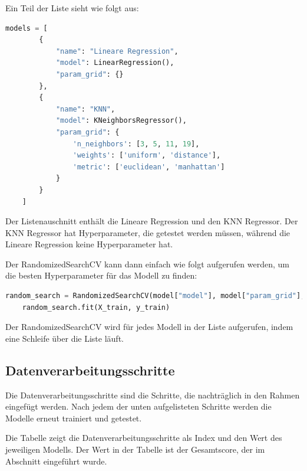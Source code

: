 Ein Teil der Liste sieht wie folgt aus:

\begin{lstlisting}[language=Python, caption=Liste der Modelle]
    models = [
        {
            "name": "Lineare Regression",
            "model": LinearRegression(),
            "param_grid": {}
        },
        {
            "name": "KNN",
            "model": KNeighborsRegressor(),
            "param_grid": {
                'n_neighbors': [3, 5, 11, 19],
                'weights': ['uniform', 'distance'],
                'metric': ['euclidean', 'manhattan']
            }
        }
    ]
\end{lstlisting}

Der Listenauschnitt enthält die Lineare Regression und den KNN Regressor. Der KNN Regressor hat Hyperparameter, die getestet werden müssen, während die Lineare Regression keine Hyperparameter hat.

Der RandomizedSearchCV kann dann einfach wie folgt aufgerufen werden, um die besten Hyperparameter für das Modell zu finden:

\begin{lstlisting}[language=Python, caption=RandomizedSearchCV]
    random_search = RandomizedSearchCV(model["model"], model["param_grid"], n_iter=5, cv=5, n_jobs=-1, verbose=2)
    random_search.fit(X_train, y_train)
\end{lstlisting}

Der RandomizedSearchCV wird für jedes Modell in der Liste aufgerufen, indem eine Schleife über die Liste läuft.

\subsection{Datenverarbeitungsschritte}\label{sec:Datenverarbeitungsschritte}
Die Datenverarbeitungsschritte sind die Schritte, die nachträglich in den Rahmen eingefügt werden. Nach jedem der unten aufgelisteten Schritte werden die Modelle erneut trainiert und getestet.

Die Tabelle zeigt die Datenverarbeitungsschritte als Index und den Wert des jeweiligen Modells. Der Wert in der Tabelle ist der Gesamtscore, der im Abschnitt  eingeführt wurde.


